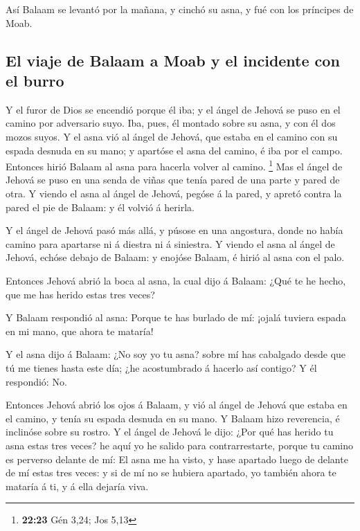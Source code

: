 Así Balaam se levantó por la mañana, y cinchó su asna, y
fué con los príncipes de Moab.

\hypertarget{el-viaje-de-balaam-a-moab-y-el-incidente-con-el-burro}{%
\subsection{El viaje de Balaam a Moab y el incidente con el
burro}\label{el-viaje-de-balaam-a-moab-y-el-incidente-con-el-burro}}

 Y el furor de Dios se encendió porque él iba; y el ángel
de Jehová se puso en el camino por adversario suyo. Iba, pues, él
montado sobre su asna, y con él dos mozos suyos.  Y el
asna vió al ángel de Jehová, que estaba en el camino con su espada
desnuda en su mano; y apartóse el asna del camino, é iba por el campo.
Entonces hirió Balaam al asna para hacerla volver al camino. \footnote{\textbf{22:23}
  Gén 3,24; Jos 5,13}  Mas el ángel de Jehová se puso en
una senda de viñas que tenía pared de una parte y pared de otra.
 Y viendo el asna al ángel de Jehová, pegóse á la pared,
y apretó contra la pared el pie de Balaam: y él volvió á herirla.

 Y el ángel de Jehová pasó más allá, y púsose en una
angostura, donde no había camino para apartarse ni á diestra ni á
siniestra.  Y viendo el asna al ángel de Jehová, echóse
debajo de Balaam: y enojóse Balaam, é hirió al asna con el palo.

 Entonces Jehová abrió la boca al asna, la cual dijo á
Balaam: ¿Qué te he hecho, que me has herido estas tres veces?

 Y Balaam respondió al asna: Porque te has burlado de mí:
¡ojalá tuviera espada en mi mano, que ahora te mataría!

 Y el asna dijo á Balaam: ¿No soy yo tu asna? sobre mí
has cabalgado desde que tú me tienes hasta este día; ¿he acostumbrado á
hacerlo así contigo? Y él respondió: No.~

 Entonces Jehová abrió los ojos á Balaam, y vió al ángel
de Jehová que estaba en el camino, y tenía su espada desnuda en su mano.
Y Balaam hizo reverencia, é inclinóse sobre su rostro.  Y
el ángel de Jehová le dijo: ¿Por qué has herido tu asna estas tres
veces? he aquí yo he salido para contrarrestarte, porque tu camino es
perverso delante de mí:  El asna me ha visto, y hase
apartado luego de delante de mí estas tres veces: y si de mí no se
hubiera apartado, yo también ahora te mataría á ti, y á ella dejaría
viva.

